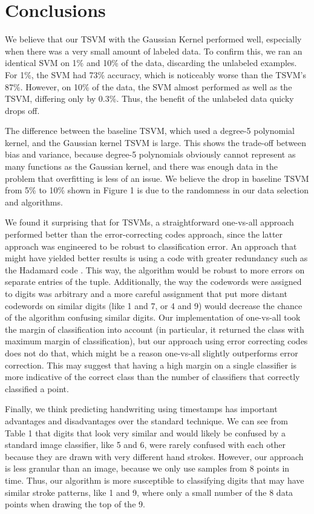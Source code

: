 \documentclass[11pt]{article}
\begin{document}
\section{Conclusions}
We believe that our TSVM with the Gaussian Kernel performed well, especially when there was a very small amount of labeled data.
To confirm this, we ran an identical SVM on 1\% and 10\% of the data, discarding the unlabeled examples. For 1\%, the SVM had 73\% accuracy, which is noticeably worse than the
TSVM's 87\%. However, on 10\% of the data, the SVM almost performed as well as the TSVM, differing only by 0.3\%. Thus, the benefit of the unlabeled data quicky drops off. \par
The difference between the baseline TSVM, which used a degree-5 polynomial kernel, and the Gaussian kernel TSVM is large. This shows the trade-off between bias and variance, because degree-5 polynomials obviously cannot represent as many functions as the Gaussian kernel, and there was enough data in the problem that overfitting is less of an issue. We believe the drop in baseline TSVM from 5\% to 10\% shown in Figure 1 is due to the randomness in our data selection and algorithms. \par
We found it surprising that for TSVMs, a straightforward one-vs-all
approach performed better than the error-correcting codes approach,
since the latter approach was engineered to be robust to classification
error. An approach that might have yielded better results is
using a code with greater redundancy such as the Hadamard
code \cite{macwilliams1977theory}. 
This way, the algorithm would be robust to more errors on separate entries
of the tuple.
Additionally, the way the codewords were assigned to digits was arbitrary
and a more careful assignment that put more distant codewords on
similar digits (like 1 and 7, or 4 and 9) would decrease the chance
of the algorithm confusing similar digits.
Our implementation of one-vs-all took the margin of classification
into account (in particular, it returned the class with maximum margin of
classification), but our approach using error correcting codes does not do that,
which might be a reason one-vs-all slightly 
outperforms error correction. This may suggest that having a high margin
on a single classifier is more indicative of the correct class than
the number of classifiers that correctly classified a point.\par
Finally, we think predicting handwriting using timestamps has important advantages and disadvantages over the standard technique. We can see from Table 1 that digits that look very similar and would likely be confused by a standard image classifier, like 5 and 6, were rarely confused with each other because they are drawn with very different hand strokes. However, our approach is less granular than an image, because we only use samples from 8 points in time. Thus, our algorithm is more susceptible to classifying digits that may have similar stroke patterns, like 1 and 9, where only a small number of the 8 data points when drawing the top of the 9.
\end{document}
